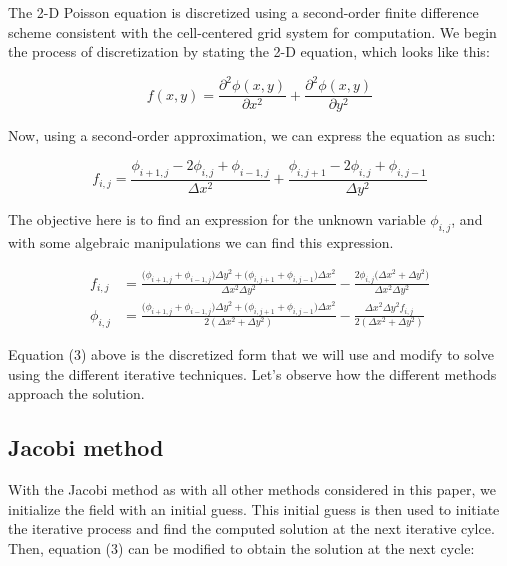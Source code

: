 \documentclass{article}
\begin{document}
\noindent The 2-D Poisson equation is discretized using a second-order finite difference scheme consistent with the cell-centered grid system for computation. We begin the process of discretization by stating the 2-D equation, which looks like this:

\begin{equation}
f(x,y) = \frac{\partial^2 \phi (x,y)}{\partial x^2} +  \frac{\partial^2 \phi (x,y)}{\partial y^2} 
\end{equation}

\noindent Now, using a second-order approximation, we can express the equation as such:

\begin{equation}
f_{i,j} = \frac{ \phi_{i+1,j}  - 2 \phi_{i,j} + \phi_{i-1,j} }{\Delta x^2} + \frac{\phi_{i,j+1}  - 2 \phi_{i,j} + \phi_{i,j-1}}{\Delta y^2}
\end{equation}

\noindent The  objective here is to find an expression for the unknown variable $\phi_{i,j} $, and with some algebraic manipulations we can find this expression.

\begin{align}
f_{i,j} &= \frac{  \bigg(  \phi_{i+1,j}   + \phi_{i-1,j}  \bigg)\Delta y^{2} +  \bigg( \phi_{i,j+1}  + \phi_{i,j-1}  \bigg)\Delta x^{2}   }{\Delta x^{2} \Delta y^{2}}  - \frac{2 \phi_{i,j} \bigg( \Delta x^{2} +  \Delta y^{2} \bigg) }{\Delta x^{2} \Delta y^{2}} \nonumber \\
\phi_{i,j} &=  \frac{  \bigg(  \phi_{i+1,j}   + \phi_{i-1,j}  \bigg)\Delta y^{2} +  \bigg( \phi_{i,j+1}  + \phi_{i,j-1}  \bigg)\Delta x^{2}   }{ 2 ( \Delta x^{2} + \Delta y^{2} )} - \frac{\Delta x^{2} \Delta y^{2} f_{i,j}}{2 ( \Delta x^{2} + \Delta y^{2} )}
\end{align}

\vspace{1em}

\noindent Equation (3) above is the discretized form that we will use and modify to solve using the different iterative techniques. Let's observe how the different methods approach the solution.

\subsection{Jacobi method}

\noindent With the Jacobi method as with all other methods considered in this paper, we initialize the field with an initial guess. This initial guess is then used to initiate the iterative process and find the computed solution at the next iterative cylce. Then, equation (3) can be modified to obtain the  solution at the next cycle:
\end{document}

